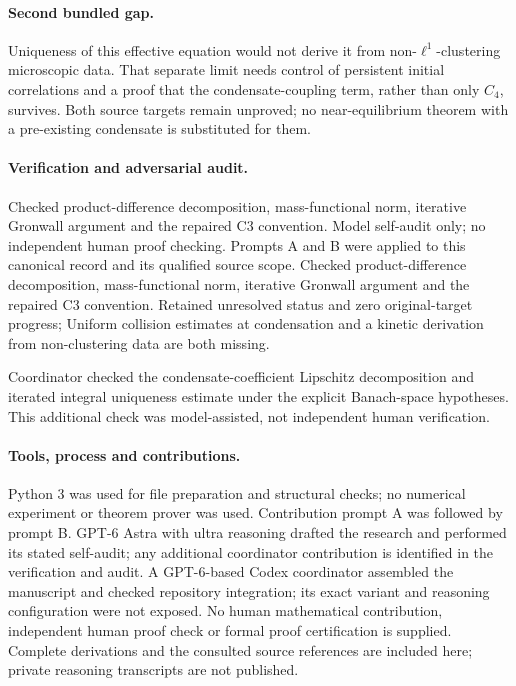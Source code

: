 \documentclass[11pt]{article}
\begin{document}
\paragraph{Second bundled gap.} Uniqueness of this effective equation would not derive it from non-$\ell^1$-clustering microscopic data. That separate limit needs control of persistent initial correlations and a proof that the condensate-coupling term, rather than only $C_4$, survives. Both source targets remain unproved; no near-equilibrium theorem with a pre-existing condensate is substituted for them.

\paragraph{Verification and adversarial audit.}
Checked product-difference decomposition, mass-functional norm, iterative Gronwall argument and the repaired C3 convention. Model self-audit only; no independent human proof checking. Prompts A and B were applied to this canonical record and its qualified source scope. Checked product-difference decomposition, mass-functional norm, iterative Gronwall argument and the repaired C3 convention. Retained unresolved status and zero original-target progress; Uniform collision estimates at condensation and a kinetic derivation from non-clustering data are both missing.

Coordinator checked the condensate-coefficient Lipschitz decomposition and iterated integral uniqueness estimate under the explicit Banach-space hypotheses. This additional check was model-assisted, not independent human verification.

\paragraph{Tools, process and contributions.}
Python 3 was used for file preparation and structural checks; no numerical experiment or theorem prover was used. Contribution prompt A was followed by prompt B. GPT-6 Astra with ultra reasoning drafted the research and performed its stated self-audit; any additional coordinator contribution is identified in the verification and audit. A GPT-6-based Codex coordinator assembled the manuscript and checked repository integration; its exact variant and reasoning configuration were not exposed. No human mathematical contribution, independent human proof check or formal proof certification is supplied. Complete derivations and the consulted source references are included here; private reasoning transcripts are not published.
\end{document}
